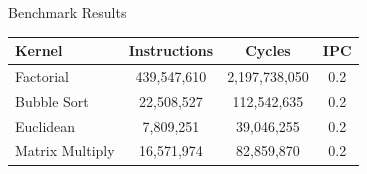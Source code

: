 \documentclass{beamer}
\begin{document}
\begin{frame}{Benchmark Results}
    \begin{table}[]
        \begin{center}
        \begin{tabular}{l|cc|c}
        \textbf{Kernel}&\textbf{Instructions}&\textbf{Cycles}&\textbf{IPC}\\
        \hline\hline
        Factorial&439,547,610&2,197,738,050&0.2\\
        \hline
        Bubble Sort&22,508,527&112,542,635&0.2\\
        \hline
        Euclidean&7,809,251&39,046,255&0.2\\
        \hline
        Matrix Multiply&16,571,974&82,859,870&0.2\\
        \end{tabular}
        \end{center}
    \end{table}
\end{frame}
\end{document}
